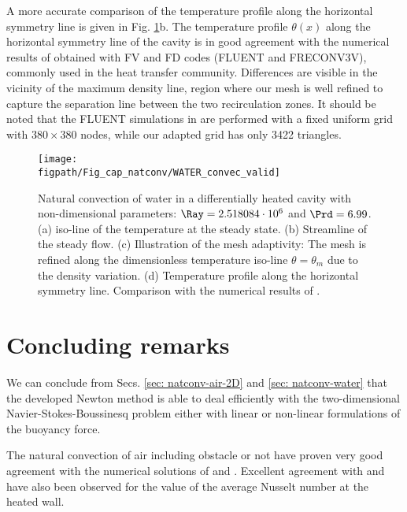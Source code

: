 A more accurate comparison of the temperature profile along the horizontal symmetry line is given in Fig. \ref{fig-T1w-isoT}b. 
The temperature profile $\theta(x)$ along the horizontal symmetry line of the cavity is in good agreement with the numerical results   of \cite{Kowalewski-2003} obtained with FV and FD codes (FLUENT and FRECONV3V), commonly used in the heat transfer community. Differences are visible in the vicinity of the maximum density line, region where our mesh is well refined to capture the separation line between the two recirculation zones. It should be noted that the FLUENT simulations in \cite{Kowalewski-2003} are performed with a fixed uniform grid with $380\times380$ nodes, while our adapted grid has only 3422 triangles.

\begin{figure}
	\begin{center}
		\texttt{[image: \\figpath/Fig\_cap\_natconv/WATER\_convec\_valid]}
	\end{center}
	\caption{Natural convection of water in a differentially heated cavity with non-dimensional parameters: $\Ray=2.518084\cdot 10^{6}$ and $\Prd=6.99$. (a) iso-line of the temperature at the steady state. (b) Streamline of the steady flow. (c) Illustration of the mesh adaptivity: The mesh is refined along the dimensionless temperature iso-line $\theta = \theta_m$ due to the density variation. (d) Temperature profile along the horizontal symmetry line. Comparison with the numerical results of \cite{Kowalewski-2003}.}
	\label{fig-T1w-isoT} %
\end{figure}

\newpage
\section{Concluding remarks}

We can conclude from Secs. \ref{sec: natconv-air-2D} and \ref{sec: natconv-water} that the developed Newton method is able to deal  efficiently with the two-dimensional Navier-Stokes-Boussinesq problem either with linear or non-linear formulations of the buoyancy force.

\noindent The natural convection of air including obstacle or not have proven very good agreement with the numerical solutions of \cite{LeQuere91} and \cite{Raluca2013}.
Excellent agreement with \cite{de1983natural} and \cite{LeQuere91} have also been observed for the value of the average Nusselt number at the heated wall. 


